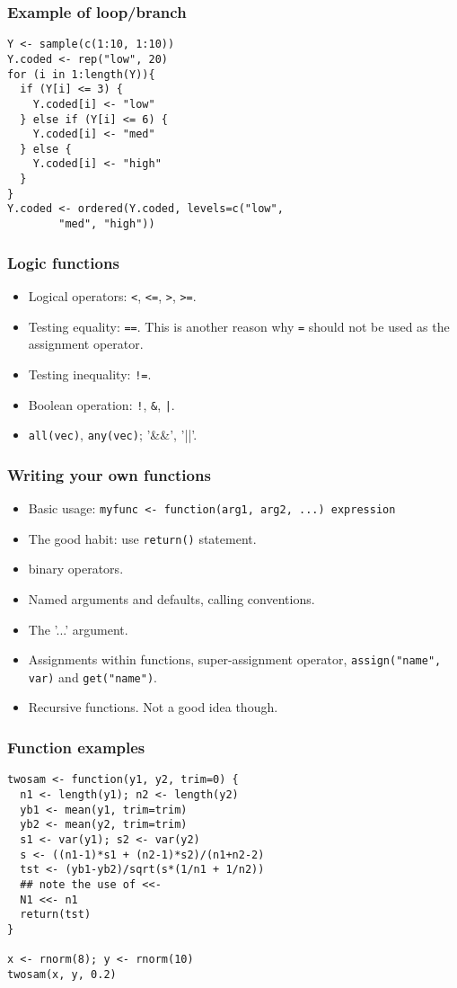 \begin{frame}[fragile, shrink=2]
  \frametitle{Example of loop/branch}
\begin{verbatim}
Y <- sample(c(1:10, 1:10))
Y.coded <- rep("low", 20)
for (i in 1:length(Y)){
  if (Y[i] <= 3) {
    Y.coded[i] <- "low"
  } else if (Y[i] <= 6) {
    Y.coded[i] <- "med"
  } else {
    Y.coded[i] <- "high"
  }
}
Y.coded <- ordered(Y.coded, levels=c("low",
        "med", "high"))
\end{verbatim}
\end{frame}

\begin{frame}
  \frametitle{Logic functions}
  \begin{itemize}
  \item Logical operators: \texttt{<}, \texttt{<=}, \texttt{>}, \texttt{>=}.
  \item Testing equality: \texttt{==}.  This is another reason why
    \texttt{=} should not be used as the assignment operator.
  \item Testing inequality: \texttt{!=}.
  \item Boolean operation: \texttt{!}, \texttt{\&}, \texttt{|}.
  \item \texttt{all(vec)}, \texttt{any(vec)}; '\&\&', '||'.
  \end{itemize}
\end{frame}

\begin{frame}
  \frametitle{Writing your own functions}
  \begin{itemize}
  \item Basic usage: \texttt{myfunc <- function(arg1, arg2, ...) expression}
  \item The good habit: use \texttt{return()} statement.
  \item binary operators.
  \item Named arguments and defaults, calling conventions.
  \item The '...' argument.
  \item Assignments within functions, super-assignment operator,
    \texttt{assign("name", var)} and \texttt{get("name")}.
  \item Recursive functions. Not a good idea though.
  \end{itemize}
\end{frame}

\begin{frame}
  \frametitle{Function examples}
\begin{verbatim}
twosam <- function(y1, y2, trim=0) {
  n1 <- length(y1); n2 <- length(y2)
  yb1 <- mean(y1, trim=trim)
  yb2 <- mean(y2, trim=trim)
  s1 <- var(y1); s2 <- var(y2)
  s <- ((n1-1)*s1 + (n2-1)*s2)/(n1+n2-2)
  tst <- (yb1-yb2)/sqrt(s*(1/n1 + 1/n2))
  ## note the use of <<-
  N1 <<- n1
  return(tst)
}

x <- rnorm(8); y <- rnorm(10)
twosam(x, y, 0.2)

\end{verbatim}
\end{frame}


